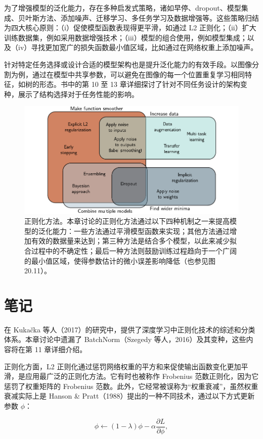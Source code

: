 \documentclass[lang=cn,newtx,10pt,scheme=chinese]{elegantbook}
\begin{document}
为了增强模型的泛化能力，存在多种启发式策略，诸如早停、dropout、模型集成、贝叶斯方法、添加噪声、迁移学习、多任务学习及数据增强等。这些策略归结为四大核心原则：（i）促使模型函数表现得更平滑，如通过 L2 正则化；（ii）扩大训练数据集，例如采用数据增强技术；（iii）模型的组合使用，例如模型集成；以及（iv）寻找更加宽广的损失函数最小值区域，比如通过在网络权重上添加噪声。

针对特定任务选择或设计合适的模型架构也是提升泛化能力的有效手段。以图像分割为例，通过在模型中共享参数，可以避免在图像的每一个位置重复学习相同特征，如树的形态。书中的第 10 至 13 章详细探讨了针对不同任务设计的架构变种，展示了结构选择对于任务性能的影响。

\begin{figure}[ht!]
	\centering
	\includegraphics[width=0.7\linewidth]{PDFFigures/UDLChap9PDF/RegMethods.pdf}
	\caption{正则化方法。本章讨论的正则化方法通过以下四种机制之一来提高模型的泛化能力：一些方法通过平滑模型函数来实现；其他方法通过增加有效的数据量来达到；第三种方法是结合多个模型，以此来减少拟合过程中的不确定性；最后一种方法则鼓励训练过程趋向于一个广阔的最小值区域，使得参数估计的微小误差影响降低（也参见图 20.11）。}
\end{figure}

\section{笔记}
在 Kukačka 等人（2017）的研究中，提供了深度学习中正则化技术的综述和分类体系。本章讨论中遗漏了 BatchNorm（Szegedy 等人，2016）及其变种，这些内容将在第 11 章详细介绍。

正则化方面，L2 正则化通过惩罚网络权重的平方和来促使输出函数变化更加平滑，是应用最广泛的正则化方法。它有时也被称作 Frobenius 范数正则化，因为它惩罚了权重矩阵的 Frobenius 范数。此外，它经常被误称为“权重衰减”，虽然权重衰减实际上是 Hanson \& Pratt（1988）提出的一种不同技术，通过以下方式更新参数 \(\phi\)：

\begin{equation}
\phi \leftarrow (1 - \lambda)\phi - \alpha \frac{\partial L}{\partial \phi}, 
\end{equation}
\end{document}
